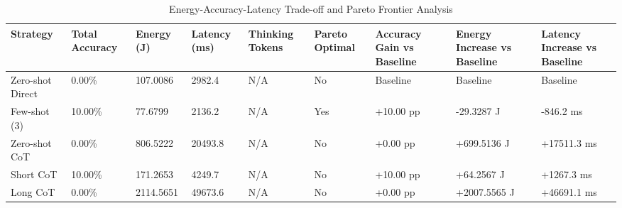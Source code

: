 \begin{table}
\caption{Energy-Accuracy-Latency Trade-off and Pareto Frontier Analysis}
\label{tab:tradeoff_comparison}
\begin{tabular}{lllllllll}
\toprule
Strategy & Total Accuracy & Energy (J) & Latency (ms) & Thinking Tokens & Pareto Optimal & Accuracy Gain vs Baseline & Energy Increase vs Baseline & Latency Increase vs Baseline \\
\midrule
Zero-shot Direct & 0.00\% & 107.0086 & 2982.4 & N/A & No & Baseline & Baseline & Baseline \\
Few-shot (3) & 10.00\% & 77.6799 & 2136.2 & N/A & Yes & +10.00 pp & -29.3287 J & -846.2 ms \\
Zero-shot CoT & 0.00\% & 806.5222 & 20493.8 & N/A & No & +0.00 pp & +699.5136 J & +17511.3 ms \\
Short CoT & 10.00\% & 171.2653 & 4249.7 & N/A & No & +10.00 pp & +64.2567 J & +1267.3 ms \\
Long CoT & 0.00\% & 2114.5651 & 49673.6 & N/A & No & +0.00 pp & +2007.5565 J & +46691.1 ms \\
\bottomrule
\end{tabular}
\end{table}
